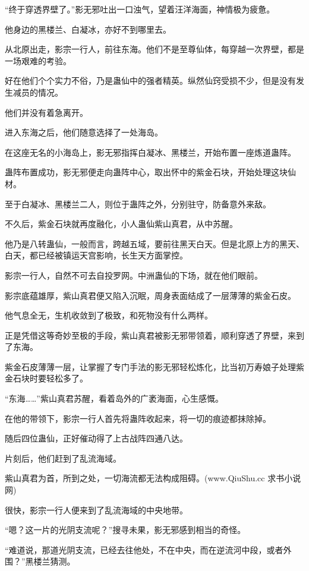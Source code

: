 
\begin{this_body}

“终于穿透界壁了。”影无邪吐出一口浊气，望着汪洋海面，神情极为疲惫。

他身边的黑楼兰、白凝冰，亦好不到哪里去。

从北原出走，影宗一行人，前往东海。他们不是至尊仙体，每穿越一次界壁，都是一场艰难的考验。

好在他们个个实力不俗，乃是蛊仙中的强者精英。纵然仙窍受损不少，但是没有发生减员的情况。

他们并没有着急离开。

进入东海之后，他们随意选择了一处海岛。

在这座无名的小海岛上，影无邪指挥白凝冰、黑楼兰，开始布置一座炼道蛊阵。

蛊阵布置成功，影无邪便走向蛊阵中心，取出怀中的紫金石块，开始处理这块仙材。

至于白凝冰、黑楼兰二人，则位于蛊阵之外，分别驻守，防备意外来敌。

不久后，紫金石块就再度融化，小人蛊仙紫山真君，从中苏醒。

他乃是八转蛊仙，一般而言，跨越五域，要前往黑天白天。但是北原上方的黑天、白天，都已经被镇运天宫影响，长生天方面掌控。

影宗一行人，自然不可去自投罗网。中洲蛊仙的下场，就在他们眼前。

影宗底蕴雄厚，紫山真君便又陷入沉眠，周身表面结成了一层薄薄的紫金石皮。

他气息全无，生机收敛到了极致，和死物没有什么两样。

正是凭借这等奇妙至极的手段，紫山真君被影无邪带领着，顺利穿透了界壁，来到了东海。

紫金石皮薄薄一层，让掌握了专门手法的影无邪轻松炼化，比当初万寿娘子处理紫金石块时要轻松多了。

“东海……”紫山真君苏醒，看着岛外的广袤海面，心生感慨。

在他的带领下，影宗一行人首先将蛊阵收起来，将一切的痕迹都抹除掉。

随后四位蛊仙，正好催动得了上古战阵四通八达。

片刻后，他们赶到了乱流海域。

紫山真君为首，所到之处，一切海流都无法构成阻碍。(www.QiuShu.cc 求书小说网)

很快，影宗一行人便来到了乱流海域的中央地带。

“嗯？这一片的光阴支流呢？”搜寻未果，影无邪感到相当的奇怪。

“难道说，那道光阴支流，已经去往他处，不在中央，而在逆流河中段，或者外围？”黑楼兰猜测。


\end{this_body}
